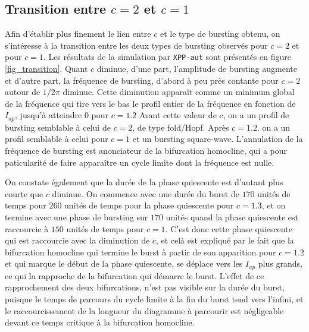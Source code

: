 \documentclass[12pt,a4paper,onecolumn]{article}
\begin{document}
\subsection{Transition entre $c=2$ et $c=1$}

Afin d'établir plus finement le lien entre $c$ et le type de bursting obtenu, on s'intéresse à la transition entre les deux types de bursting observés pour $c=2$ et pour $c=1$. Les résultats de la simulation par \texttt{XPP-aut} sont présentés en figure \ref{fig_transition}. Quant $c$ diminue, d'une part, l'amplitude de bursting augmente et d'autre part, la fréquence de bursting, d'abord à peu près contante pour $c=2$ autour de $1/2\pi$ diminue. Cette diminution apparaît comme un minimum global de la fréquence qui tire vers le bas le profil entier de la fréquence en fonction de $I_{ap}$, jusqu'à atteindre 0 pour $c=1.2$ Avant cette valeur de c, on a un profil de bursting semblable à celui de $c=2$, de type fold/Hopf. Après $c=1.2.$ on a un profil semblable à celui pour $c=1$ et un bursting square-wave. L'annulation de la fréquence de bursting est anonciateur de la bifurcation homocline, qui a pour paticularité de faire apparaître un cycle limite dont la fréquence est nulle.

On constate également que la durée de la phase quiescente est d'autant plus courte que $c$ diminue. On commence avec une durée du burst de $170$ unités de temps pour $260$ unités de temps pour la phase quiescente pour $c=1.3$, et on termine avec une phase de bursting sur $170$ unités quand la phase quiescente est raccourcie à $150$ unités de temps pour $c=1$. C'est donc cette phase quiescente qui est raccourcie avec la diminution de $c$, et celà est expliqué par le fait que la bifurcation homocline qui termine le burst à partir de son apparition pour $c=1.2$ et qui marque le début de la phase quiescente, se déplace vers les $I_{ap}$ plus grands, ce qui la rapproche de la bifurcation qui démarre le burst. L'effet de ce rapprochement des deux bifurcations, n'est pas visible sur la durée du burst, puisque le temps de parcours du cycle limite à la fin du burst tend vers l'infini, et le raccourcissement de la longueur du diagramme à parcourir est négligeable devant ce temps critique à la bifurcation homocline.
\end{document}
